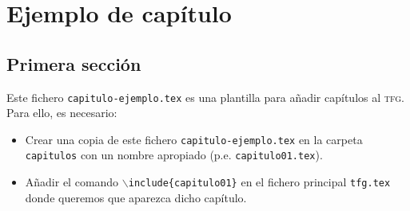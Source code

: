 
\chapter{Ejemplo de capítulo}

\section{Primera sección}

Este fichero \texttt{capitulo-ejemplo.tex} es una plantilla para añadir capítulos al \textsc{tfg}. Para ello, es necesario:
\begin{itemize}
  \item Crear una copia de este fichero \texttt{capitulo-ejemplo.tex} en la carpeta \texttt{capitulos} con un nombre apropiado (p.e. \texttt{capitulo01.tex}).
  \item Añadir el comando \texttt{$\backslash$include\{capitulo01\}} en el fichero principal \texttt{tfg.tex} donde queremos que aparezca dicho capítulo.
\end{itemize}


\endinput
